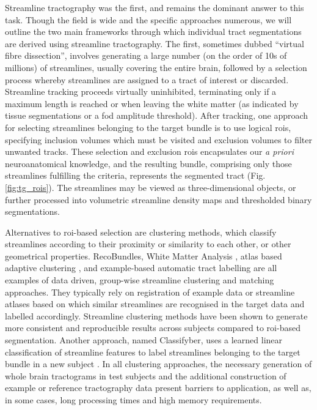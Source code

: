 Streamline tractography was the first, and remains the dominant answer to this task.
Though the field is wide and the specific approaches numerous, we will outline the two main frameworks through which individual tract segmentations are derived using streamline tractography.
The first, sometimes dubbed ``virtual fibre dissection'', involves generating a large number (on the order of 10s of millions) of streamlines, usually covering the entire brain, followed by a selection process whereby streamlines are assigned to a tract of interest or discarded.
Streamline tracking proceeds virtually uninhibited, terminating only if a maximum length is reached or when leaving the white matter (as indicated by tissue segmentations\autocite{Smith2012} or a \gls{fod} amplitude threshold).
After tracking, one approach for selecting streamlines belonging to the target bundle is to use logical \glspl{roi}, specifying inclusion volumes which must be visited and exclusion volumes to filter unwanted tracks.
These selection and exclusion \glspl{roi} encapsulates our \textit{a priori} neuroanatomical knowledge, and the resulting bundle, comprising only those streamlines fulfilling the criteria, represents the segmented tract (Fig. \ref{fig:tg_rois}).
The streamlines may be viewed as three-dimensional objects, or further processed into volumetric streamline density maps\autocite{Calamante2010} and thresholded binary segmentations.

Alternatives to \gls{roi}-based selection are clustering methods, which classify streamlines according to their proximity or similarity to each other, or other geometrical properties.
RecoBundles\autocite{Garyfallidis2018}, White Matter Analysis \autocite{ODonnell2017, ODonnell2007}, atlas based adaptive clustering \autocite{Tunc2014}, and example-based automatic tract labelling \autocite{Yoo2015} are all examples of data driven, group-wise streamline clustering and matching approaches.
They typically rely on registration of example data or streamline atlases based on which similar streamlines are recognised in the target data and labelled accordingly.
Streamline clustering methods have been shown to generate more consistent and reproducible results across subjects compared to \gls{roi}-based segmentation\autocite{Sydnor2018}.
Another approach, named Classifyber, uses a learned linear classification of streamline features to label streamlines belonging to the target bundle in a new subject \autocite{Berto2021}.
In all clustering approaches, the necessary generation of whole brain tractograms in test subjects and the additional construction of example or reference tractography data present barriers to application, as well as, in some cases, long processing times and high memory requirements\autocite{Wasserthal2018}.

